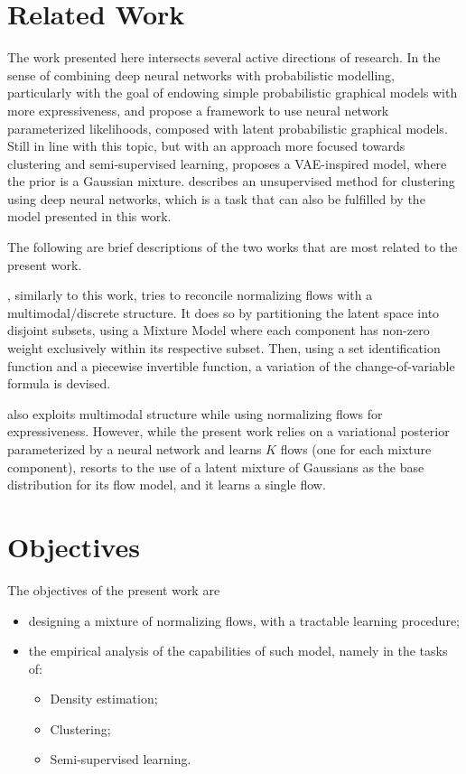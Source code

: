 \section{Related Work}
\label{section:related}

The work presented here intersects several active directions of research.
In the sense of combining deep neural networks with probabilistic modelling,
particularly with the goal of endowing simple probabilistic graphical models
with more expressiveness, \autocite{svae} and \autocite{lin2018variational} propose a
framework to use neural network parameterized likelihoods, composed with latent
probabilistic graphical models. Still in line with this topic, but with an
approach more focused towards clustering and semi-supervised learning, \autocite{gmVAE}
proposes a VAE-inspired model, where the prior is a Gaussian mixture. \autocite{DEC}
describes an unsupervised method for clustering using deep neural networks, which
is a task that can also be fulfilled by the model presented in this work.

The following are brief descriptions of the two works that are most related to
the present work.

\autocite{RAD}, similarly to this work, tries to reconcile normalizing flows with a
multimodal/discrete structure. It does so by partitioning the latent space into
disjoint subsets, using a Mixture Model where each component has non-zero
weight exclusively within its respective subset. Then, using a set identification
function and a piecewise invertible function, a variation of the change-of-variable
formula is devised.

\autocite{semisuplearning_nflows} also exploits multimodal structure while
using normalizing flows for expressiveness. However, while the present work relies on
a variational posterior parameterized by a neural network and learns $K$ flows
(one for each mixture component), \autocite{semisuplearning_nflows} resorts to the use of a
latent mixture of Gaussians as the base distribution for its flow model, and it
learns a single flow.

\section{Objectives}
\label{section:objectives}

The objectives of the present work are
\begin{itemize}
    \item designing a mixture of normalizing flows, with a tractable learning procedure;
    \item the empirical analysis of the capabilities of such model, namely in the tasks of:
        \begin{itemize}
        \item Density estimation;
        \item Clustering;
        \item Semi-supervised learning.
        \end{itemize}
\end{itemize}

